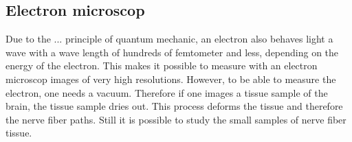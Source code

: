 \subsection{Electron microscop}
% 
Due to the ... principle of quantum mechanic, an electron also behaves light a wave with a wave length of hundreds of femtometer and less, depending on the energy of the electron.
This makes it possible to measure with an electron microscop images of very high resolutions.
However, to be able to measure the electron, one needs a vacuum.
Therefore if one images a tissue sample of the brain, the tissue sample dries out.
This process deforms the tissue and therefore the nerve fiber paths.
Still it is possible to study the small samples of nerve fiber tissue.
% 
% 
% 
